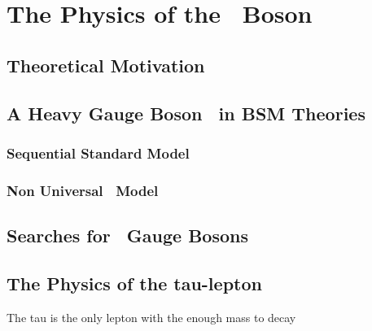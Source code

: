 \chapter[The Physics Of The \Zprime~Boson]{The Physics of the \Zprime~Boson}
\label{chap:Zp}

\section{Theoretical Motivation}
\label{sec:Motivation}

\section{A Heavy Gauge Boson \Zprime~in BSM Theories}
\label{sec:Models}

\subsection{Sequential Standard Model}
\label{subsec:SSM}

\subsection{Non Universal \Zprime~Model}
\label{subsec:Models}

\section{Searches for \Zprime~Gauge Bosons}
\label{sec:Models}


\section{The Physics of the tau-lepton}
\label{sec:Taus}

The tau is the only lepton with the enough mass to decay 